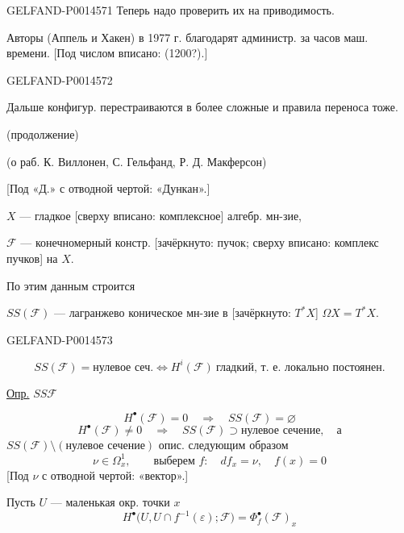 \begin{GelfandAdjacentEvidence}{GELFAND-P001457}{1}
Теперь надо проверить их на приводимость.

Авторы (Аппель и Хакен) в 1977 г. благодарят администр. за  часов маш. времени.
[Под числом вписано: (1200?).]
\end{GelfandAdjacentEvidence}
\begin{GelfandAdjacentEvidence}{GELFAND-P001457}{2}


Дальше конфигур. перестраиваются в более сложные и правила переноса тоже.

 (продолжение)

(о раб. К. Виллонен, С. Гельфанд, Р. Д. Макферсон)

[Под «Д.» с отводной чертой: «Дункан».]

\(X\) — гладкое [сверху вписано: комплексное] алгебр. мн-зие,

\(\mathcal F\) — конечномерный констр. [зачёркнуто: пучок; сверху вписано: комплекс пучков] на \(X\).

По этим данным строится

\(SS(\mathcal F)\) — лагранжево коническое мн-зие в [зачёркнуто: \(T^*X\)] \(\Omega X=T^*X\).
\end{GelfandAdjacentEvidence}
\begin{GelfandAdjacentEvidence}{GELFAND-P001457}{3}


\[
SS(\mathcal F)=\text{нулевое сеч.}
\Longleftrightarrow H^i(\mathcal F)\ \text{гладкий, т. е. локально постоянен}.
\]

\uline{Опр.} \(SS\mathcal F\)

\begin{equation*}
H^\bullet(\mathcal F)=0\quad\Rightarrow\quad SS(\mathcal F)=\varnothing \tag{1}
\end{equation*}
\[
H^\bullet(\mathcal F)\ne0\quad\Rightarrow\quad
SS(\mathcal F)\supset\text{нулевое сечение},\quad\text{а}
\]
\(SS(\mathcal F)\setminus(\text{нулевое сечение})\) опис. следующим образом
\[
\nu\in\Omega_x^1,\qquad\text{выберем }f\colon\quad df_x=\nu,\quad f(x)=0
\]
[Под \(\nu\) с отводной чертой: «вектор».]

Пусть \(U\) — маленькая окр. точки \(x\)
\begin{equation*}
H^\bullet\bigl(U,U\cap f^{-1}(\varepsilon);\mathcal F\bigr)
=\Phi_f^\bullet(\mathcal F)_x \tag{2}
\end{equation*}
\end{GelfandAdjacentEvidence}
